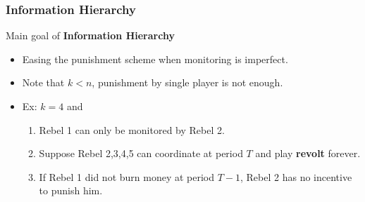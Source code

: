 \documentclass[10pt]{beamer}
\begin{document}
\begin{frame}
   \frametitle{Information Hierarchy}


Main goal of \textbf{Information Hierarchy}
\begin{itemize}
\item Easing the punishment scheme when monitoring is imperfect.
\item Note that $k<n$, punishment by single player is not enough.
\item Ex: $k=4$ and
\begin{center}
\end{center}

\begin{enumerate}
\item Rebel 1 can only be monitored by Rebel 2.
\item Suppose Rebel 2,3,4,5 can coordinate at period $T$ and play \textbf{revolt} forever.
\item If Rebel 1 did not burn money at period $T-1$, Rebel 2 has no incentive to punish him.
\end{enumerate}

\end{itemize}



\end{frame}
\end{document}
